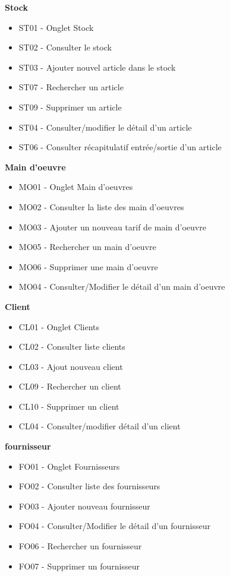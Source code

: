 \newpara
\textbf{Stock}
\begin{itemize}
  \item \checkmark ST01 - Onglet Stock
  \item \checkmark ST02 - Consulter le stock
  \item \checkmark ST03 - Ajouter nouvel article dans le stock
  \item \checkmark ST07 - Rechercher un article
  \item \checkmark ST09 - Supprimer un article
  \item \checkmark ST04 - Consulter/modifier le détail d'un article
  \item \checkmark ST06 - Consulter récapitulatif entrée/sortie d'un article
\end{itemize}

\newpara
\textbf{Main d'oeuvre}
\begin{itemize}
  \item \checkmark MO01 - Onglet Main d'oeuvres
  \item \checkmark MO02 - Consulter la liste des main d'oeuvres
  \item \checkmark MO03 - Ajouter un nouveau tarif de main d'oeuvre
  \item \checkmark MO05 - Rechercher un main d'oeuvre
  \item \checkmark MO06 - Supprimer une main d'oeuvre
  \item \checkmark MO04 - Consulter/Modifier le détail d'un main d'oeuvre
\end{itemize}

\newpara
\textbf{Client}
\begin{itemize}
  \item \checkmark CL01 - Onglet Clients
  \item \checkmark CL02 - Consulter liste clients
  \item \checkmark CL03 - Ajout nouveau client
  \item \checkmark CL09 - Rechercher un client 
  \item \checkmark CL10 - Supprimer un client
  \item \checkmark CL04 - Consulter/modifier détail d'un client
\end{itemize}

\newpage

\textbf{fournisseur}
\begin{itemize}
  \item \checkmark FO01 - Onglet Fournisseurs
  \item \checkmark FO02 - Consulter liste des fournisseurs
  \item \checkmark FO03 - Ajouter nouveau fournisseur
  \item \checkmark FO04 - Consulter/Modifier le détail d'un fournisseur
  \item \checkmark FO06 - Rechercher un fournisseur
  \item \checkmark FO07 - Supprimer un fournisseur
\end{itemize}


